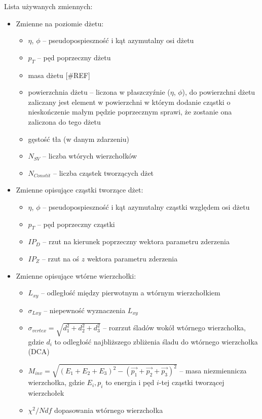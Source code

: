 Lista używanych zmiennych:
\begin{itemize}
	\item Zmienne na poziomie dżetu:
	\begin{itemize}	
		\item $\eta$, $\phi$ -- pseudopospieszność i kąt azymutalny osi dżetu
		\item $p_T$ -- pęd poprzeczny dżetu
		\item masa dżetu [\#REF]
		\item powierzchnia dżetu -- liczona w płaszczyźnie ($\eta$, $\phi$),   do powierzchni dżetu zaliczany jest element w powierzchni w którym dodanie cząstki o nieskończenie małym pędzie poprzecznym sprawi, że zostanie ona zaliczona do tego dżetu \cite{Cacciari:2007fd}
		\item gęstość tła (w danym zdarzeniu)
		\item $N_{SV}$ -- liczba wtórych wierzchołków
		\item $N_{Constit}$ -- liczba cząstek tworzących dżet
	\end{itemize}
	
	
	\item Zmienne opisujące cząstki tworzące dżet:
	\begin{itemize}	
		\item $\eta$, $\phi$ -- pseudopospieszność i kąt azymutalny cząstki względem osi dżetu
		\item $p_T$ -- pęd poprzeczny cząstki
		\item $IP_D$ -- rzut na kierunek poprzeczny wektora parametru zderzenia
		\item $IP_Z$ -- rzut na oś $z$ wektora parametru zderzenia
	\end{itemize}	
	
	
	\item Zmienne opisujące wtórne wierzchołki:
	\begin{itemize}	
		\item $L_{xy}$ -- odległość między pierwotnym a wtórnym wierzchołkiem 
		\item $\sigma_{Lxy}$ -- niepewność wyznaczenia $L_{xy}$
		\item $\sigma_{vertex} = \sqrt{d_1^2 + d_2^2 + d_3^2}$ -- rozrzut śladów  wokół wtórnego wierzchołka, gdzie $d_i$ to odległość najbliższego zbliżenia śladu do wtórnego wierzchołka (DCA) %
		\item $M_{inv} = \sqrt{(E_1 + E_2 + E_3)^2 - (\vec{p_1} + \vec{p_2} + \vec{p_3})^2}$ -- masa niezmiennicza wierzchołka, gdzie $E_i, p_i$ to energia i pęd $i$-tej cząstki tworzącej wierzchołek
		\item $\chi^2/Ndf$  dopasowania wtórnego wierzchołka
	\end{itemize}
\end{itemize}


